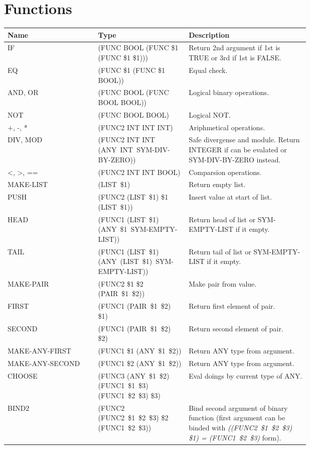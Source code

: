 \documentclass[a4paper]{article}
\begin{document}
 \section{Functions}
  \begin{tabular}{|l|p{0.3\linewidth}|p{0.4\linewidth}|}
   \hline
    Name & Type & Description \\
   \hline
    IF & (FUNC BOOL (FUNC \$1 (FUNC \$1 \$1))) & Return 2nd argument if 1st is TRUE or 3rd if 1st is FALSE. \\
   \hline
    EQ & (FUNC \$1 (FUNC \$1 BOOL)) & Equal check. \\
   \hline
    AND, OR & (FUNC BOOL (FUNC BOOL BOOL)) & Logical binary operations. \\
   \hline
    NOT & (FUNC BOOL BOOL) & Logical NOT. \\
   \hline
    +, -, * & (FUNC2 INT INT INT) & Ariphmetical operations. \\
   \hline
    DIV, MOD & (FUNC2 INT INT (ANY~INT~SYM-DIV-BY-ZERO)) & Safe divergense and module. Return INTEGER if can be evalated or SYM-DIV-BY-ZERO instead. \\
   \hline
    <, >, == & (FUNC2 INT INT BOOL) & Comparsion operations. \\
   \hline
    MAKE-LIST & (LIST~\$1) & Return empty list. \\
   \hline
    PUSH & (FUNC2 (LIST~\$1) \$1 (LIST~\$1)) & Insert value at start of list. \\
   \hline
    HEAD & (FUNC1 (LIST~\$1) (ANY~\$1~SYM-EMPTY-LIST)) & Return head of list or SYM-EMPTY-LIST if it empty. \\
   \hline
    TAIL & (FUNC1 (LIST~\$1) (ANY~(LIST~\$1)~SYM-EMPTY-LIST)) & Return tail of list or SYM-EMPTY-LIST if it empty. \\
   \hline
    MAKE-PAIR & (FUNC2 \$1 \$2 (PAIR~\$1~\$2)) & Make pair from value. \\
   \hline
    FIRST & (FUNC1 (PAIR~\$1~\$2) \$1) & Return first element of pair. \\
   \hline
    SECOND & (FUNC1 (PAIR~\$1~\$2) \$2) & Return second element of pair. \\
   \hline
    MAKE-ANY-FIRST & (FUNC1 \$1 (ANY~\$1~\$2)) & Return ANY type from argument. \\
   \hline
    MAKE-ANY-SECOND & (FUNC1 \$2 (ANY~\$1~\$2)) & Return ANY type from argument. \\
   \hline
    CHOOSE & (FUNC3 (ANY~\$1~\$2) (FUNC1~\$1~\$3) (FUNC1~\$2~\$3) \$3) & Eval doings by current type of ANY. \\
   \hline
    BIND2 & (FUNC2 (FUNC2~\$1~\$2~\$3) \$2 (FUNC1~\$2~\$3)) & Bind second argument of binary function (first argument can be binded with \textit{((FUNC2~\$1~\$2~\$3) \$1) = (FUNC1~\$2~\$3)} form). \\
   \hline
  \end{tabular}
\end{document}
